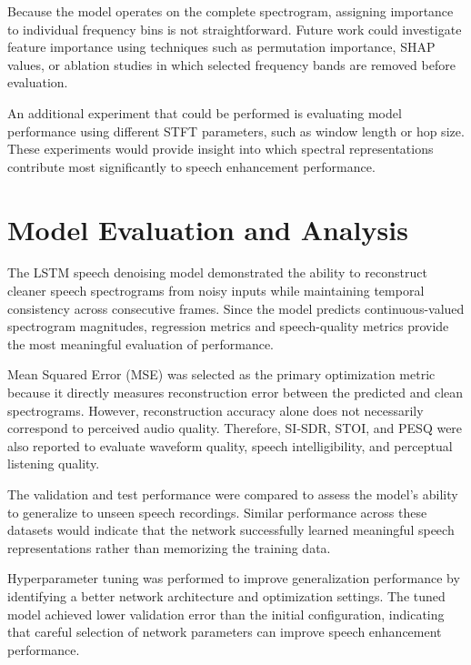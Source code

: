 \documentclass[11pt, letterpaper]{article}
\begin{document}
Because the model operates on the complete spectrogram, assigning importance to individual frequency bins is not straightforward. Future work could investigate feature importance using techniques such as permutation importance, SHAP values, or ablation studies in which selected frequency bands are removed before evaluation.

An additional experiment that could be performed is evaluating model performance using different STFT parameters, such as window length or hop size. These experiments would provide insight into which spectral representations contribute most significantly to speech enhancement performance.




\section{Model Evaluation and Analysis}

The LSTM speech denoising model demonstrated the ability to reconstruct cleaner speech spectrograms from noisy inputs while maintaining temporal consistency across consecutive frames. Since the model predicts continuous-valued spectrogram magnitudes, regression metrics and speech-quality metrics provide the most meaningful evaluation of performance.

Mean Squared Error (MSE) was selected as the primary optimization metric because it directly measures reconstruction error between the predicted and clean spectrograms. However, reconstruction accuracy alone does not necessarily correspond to perceived audio quality. Therefore, SI-SDR, STOI, and PESQ were also reported to evaluate waveform quality, speech intelligibility, and perceptual listening quality.

The validation and test performance were compared to assess the model's ability to generalize to unseen speech recordings. Similar performance across these datasets would indicate that the network successfully learned meaningful speech representations rather than memorizing the training data.

Hyperparameter tuning was performed to improve generalization performance by identifying a better network architecture and optimization settings. The tuned model achieved lower validation error than the initial configuration, indicating that careful selection of network parameters can improve speech enhancement performance.
\end{document}
